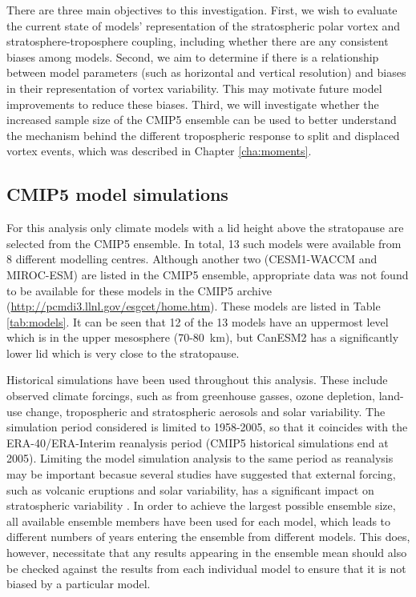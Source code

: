 There are three main objectives to this investigation. First, we wish to
evaluate the current state of models' representation of the stratospheric polar
vortex and stratosphere-troposphere coupling, including whether there are any
consistent biases among models. Second, we aim to determine if there is a
relationship between model parameters (such as horizontal and vertical
resolution) and biases in their representation of vortex variability. This may
motivate future model improvements to reduce these biases. Third, we will
investigate whether the increased sample size of the CMIP5 ensemble can be used
to better understand the mechanism behind the different tropospheric response to
split and displaced vortex events, which was described in Chapter
\ref{cha:moments}.

\subsection{CMIP5 model simulations}

For this analysis only climate models with a lid height above the stratopause
are selected from the CMIP5 ensemble. In total, 13 such models were available
from 8 different modelling centres. Although another two (CESM1-WACCM and
MIROC-ESM) are listed in the CMIP5 ensemble, appropriate data was not found to
be available for these models in the CMIP5 archive
(\url{http://pcmdi3.llnl.gov/esgcet/home.htm}). These models are listed in Table
\ref{tab:models}. It can be seen that 12 of the 13 models have an uppermost
level which is in the upper mesosphere (70-80~km), but CanESM2 has a
significantly lower lid which is very close to the stratopause.

Historical simulations have been used throughout this analysis. These include
observed climate forcings, such as from greenhouse gasses, ozone depletion,
land-use change, tropospheric and stratospheric aerosols and solar
variability. The simulation period considered is limited to 1958-2005, so that
it coincides with the ERA-40/ERA-Interim reanalysis period (CMIP5 historical
simulations end at 2005). Limiting the model simulation analysis to the same
period as reanalysis may be important becasue several studies have suggested
that external forcing, such as volcanic eruptions and solar variability, has a
significant impact on stratospheric variability
\citep[e.g.,][]{Robock2000,Gray2010}. In order to achieve the
largest possible ensemble size, all available ensemble members have been used
for each model, which leads to different numbers of years entering the ensemble
from different models. This does, however, necessitate that any results
appearing in the ensemble mean should also be checked against the results from
each individual model to ensure that it is not biased by a particular model.

